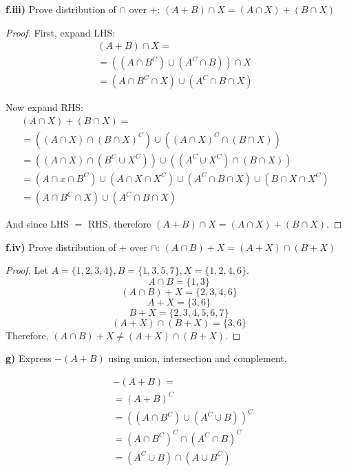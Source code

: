 \documentclass[titlepage, letterpaper, fleqn]{article}
\newcommand{\spacepls}{\vspace{5mm}}
\begin{document}
\spacepls

{\large \textbf{f.iii)} Prove distribution of \(\cap\) over \(+\): \((A + B) \cap X = (A \cap X) + (B \cap X)\)}

\begin{proof}
First, expand LHS:
\begin{align*}
	& (A + B) \cap X =
	\\ &= ((A \cap B^C) \cup (A^C \cap B)) \cap X &&\tag*{by definition}
	\\ &= (A \cap B^C \cap X) \cup (A^C \cap B \cap X) &&\tag*{by distribution}
\end{align*}

\spacepls

Now expand RHS:
\begin{align*}
& (A \cap X) + (B \cap X) =
\\ &= ((A \cap X) \cap (B \cap X)^C) \cup ((A \cap X)^C \cap (B \cap X)) &&\tag*{by definition}
\\ &= ((A \cap X) \cap (B^C \cup X^C)) \cup ((A^C \cup X^C) \cap (B \cap X)) &&\tag*{by de Morgan}
\\ &= (A \cap x \cap B^C) \cup (A \cap X \cap X^C) \cup (A^C \cap B \cap X) \cup (B \cap X \cap X^C) &&\tag*{by distribution}
\\ &= (A \cap B^C \cap X) \cup (A^C \cap B \cap X) &&\tag*{by intersection with complement}
\end{align*}

And since LHS \(=\) RHS, therefore \((A + B) \cap X = (A \cap X) + (B \cap X)\).
\end{proof}

\pagebreak

{\large \textbf{f.iv)} Prove distribution of \(+\) over \(\cap\): \((A \cap B) + X = (A + X) \cap (B + X)\)}
\begin{proof}
Let \(A = \{1, 2, 3, 4\}, B = \{1, 3, 5, 7\}, X = \{1, 2, 4, 6\}\).
\[A \cap B = \{1, 3\}\]
\[(A \cap B) + X = \{2, 3, 4, 6\}\]
\[A + X = \{3, 6\}\]
\[B + X = \{2, 3, 4, 5, 6, 7\}\]
\[(A + X) \cap (B + X) = \{3, 6\}\]
Therefore, \((A \cap B) + X \not = (A + X) \cap (B + X)\).
\end{proof}

\spacepls

{\large \textbf{g)} Express \(-(A+B)\) using union, intersection and complement.}

\begin{align*}
	& -(A + B) =
	\\ &= (A + B)^C
	\\ &= ((A \cap B^C) \cup (A^C \cup B))^C
	\\ &= (A \cap B^C)^C \cap (A^C \cap B)^C
	\\ &= (A^C \cup B) \cap (A \cup B^C) \tag*{\(\square\)}
\end{align*}
\end{document}
